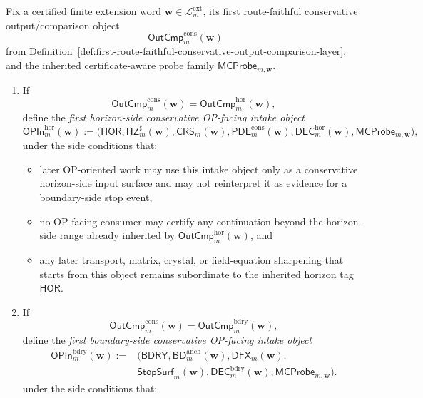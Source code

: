 \begin{definition}
\label{def:first-conservative-op-facing-intake-layer}
Fix a certified finite extension word \(\mathbf w\in\mathcal L^{\mathrm{ext}}_{m}\), its first route-faithful conservative output/comparison object
\[
 \mathsf{OutCmp}^{\mathrm{cons}}_{m}(\mathbf w)
\]
from Definition~\ref{def:first-route-faithful-conservative-output-comparison-layer}, and the inherited certificate-aware probe family \(\mathsf{MCProbe}_{m,\mathbf w}\).
\begin{enumerate}[label=(\roman*)]
 \item If
 \[
 \mathsf{OutCmp}^{\mathrm{cons}}_{m}(\mathbf w)=\mathsf{OutCmp}^{\mathrm{hor}}_{m}(\mathbf w),
 \]
 define the \emph{first horizon-side conservative OP-facing intake object}
 \[
 \mathsf{OPIn}^{\mathrm{hor}}_{m}(\mathbf w)
 :=
 \bigl(\mathsf{HOR},\mathsf{HZ}^{\sharp}_{m}(\mathbf w),\mathsf{CRS}_{m}(\mathbf w),\mathsf{PDE}^{\mathrm{cons}}_{m}(\mathbf w),\mathsf{DEC}^{\mathrm{hor}}_{m}(\mathbf w),\mathsf{MCProbe}_{m,\mathbf w}\bigr),
 \]
 under the side conditions that:
 \begin{itemize}[leftmargin=2em]
 \item later OP-oriented work may use this intake object only as a conservative horizon-side input surface and may not reinterpret it as evidence for a boundary-side stop event,
 \item no OP-facing consumer may certify any continuation beyond the horizon-side range already inherited by \(\mathsf{OutCmp}^{\mathrm{hor}}_{m}(\mathbf w)\), and
 \item any later transport, matrix, crystal, or field-equation sharpening that starts from this object remains subordinate to the inherited horizon tag \(\mathsf{HOR}\).
 \end{itemize}
 \item If
 \[
 \mathsf{OutCmp}^{\mathrm{cons}}_{m}(\mathbf w)=\mathsf{OutCmp}^{\mathrm{bdry}}_{m}(\mathbf w),
 \]
 define the \emph{first boundary-side conservative OP-facing intake object}
 \[
 \begin{aligned}
 \mathsf{OPIn}^{\mathrm{bdry}}_{m}(\mathbf w)
 := {}& \bigl(\mathsf{BDRY},\mathsf{BD}^{\mathrm{anch}}_{m}(\mathbf w),\mathsf{DFX}_{m}(\mathbf w),\\
 &\mathsf{StopSurf}_{m}(\mathbf w),\mathsf{DEC}^{\mathrm{bdry}}_{m}(\mathbf w),\mathsf{MCProbe}_{m,\mathbf w}\bigr).
 \end{aligned}
 \]
 under the side conditions that:
 \begin{itemize}[leftmargin=2em]

\end{itemize}
\end{enumerate}
\end{definition}
